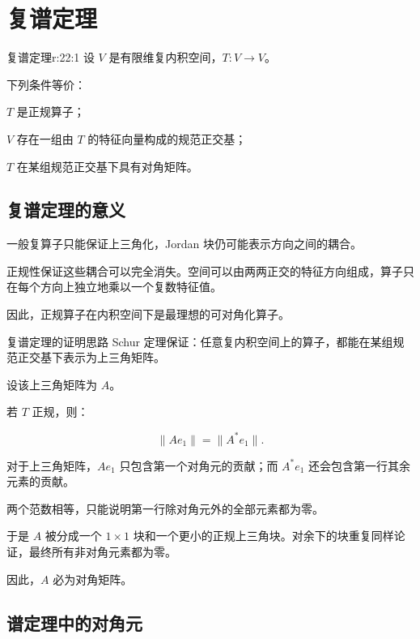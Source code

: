 
\chapter{复谱定理}


\begin{jthm}{复谱定理}{r:22:1}
设 $V$ 是有限维复内积空间，$T:V\to V$。

下列条件等价：

\begin{jenum}
\item %
$T$ 是正规算子；
\item %
$V$ 存在一组由 $T$ 的特征向量构成的规范正交基；
\item %
$T$ 在某组规范正交基下具有对角矩阵。
\end{jenum}
\end{jthm}

\section{复谱定理的意义}

一般复算子只能保证上三角化，Jordan 块仍可能表示方向之间的耦合。

正规性保证这些耦合可以完全消失。空间可以由两两正交的特征方向组成，算子只在每个方向上独立地乘以一个复数特征值。

因此，正规算子在内积空间下是最理想的可对角化算子。

\begin{jproof}{复谱定理的证明思路}
Schur 定理保证：任意复内积空间上的算子，都能在某组规范正交基下表示为上三角矩阵。

设该上三角矩阵为 $A$。

若 $T$ 正规，则：

\[
\|Ae_1\|=\|A^*e_1\|.
\]

对于上三角矩阵，$Ae_1$ 只包含第一个对角元的贡献；而 $A^*e_1$ 还会包含第一行其余元素的贡献。

两个范数相等，只能说明第一行除对角元外的全部元素都为零。

于是 $A$ 被分成一个 $1\times1$ 块和一个更小的正规上三角块。对余下的块重复同样论证，最终所有非对角元素都为零。

因此，$A$ 必为对角矩阵。
\end{jproof}

\section{谱定理中的对角元}

